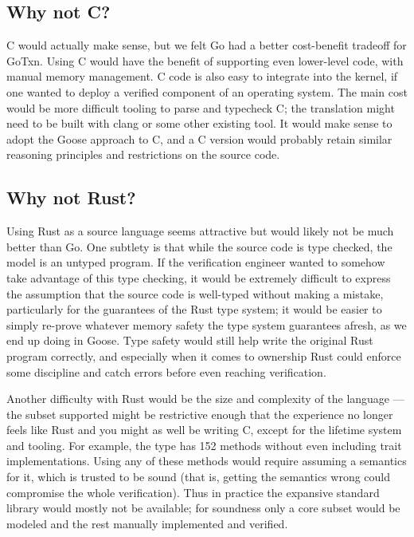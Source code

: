 \subsection{Why not C?}

C would actually make sense, but we felt Go had a better cost-benefit tradeoff
for GoTxn. Using C would have the benefit of supporting even lower-level code,
with manual memory management. C code is also easy to integrate into the kernel,
if one wanted to deploy a verified component of an operating system. The main
cost would be more difficult tooling to parse and typecheck C; the translation
might need to be built with clang or some other existing tool. It would make
sense to adopt the Goose approach to C, and a C version would probably retain
similar reasoning principles and restrictions on the source code.

\subsection{Why not Rust?}

Using Rust as a source language seems attractive but would likely not be much
better than Go. One subtlety is that while the source code is type checked, the
model is an untyped program. If the verification engineer wanted to somehow take
advantage of this type checking, it would be extremely difficult to express the
assumption that the source code is well-typed without making a mistake,
particularly for the guarantees of the Rust type system; it would be easier to
simply re-prove whatever memory safety the type system guarantees afresh, as we
end up doing in Goose. Type safety would still help write the original Rust
program correctly, and especially when it comes to ownership Rust could enforce
some discipline and catch errors before even reaching verification.

Another difficulty with Rust would be the size and complexity of the language
--- the subset supported might be restrictive enough that the experience no
longer feels like Rust and you might as well be writing C, except for the
lifetime system and tooling. For example, the  type has 152 methods
without even including trait implementations. Using any of these methods would
require assuming a semantics for it, which is trusted to be sound (that is,
getting the semantics wrong could compromise the whole verification). Thus in
practice the expansive standard library would mostly not be available; for
soundness only a core subset would be modeled and the rest manually implemented
and verified.

